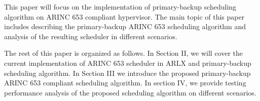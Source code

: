 \documentclass[conference]{IEEEtran}
\begin{document}
This paper will focus on the implementation of primary-backup scheduling algorithm on ARINC 653
compliant hypervisor. The main topic of this paper includes describing the primary-backup ARINC
653 scheduling algorithm and analysis of the resulting scheduler in different scenarios.

The rest of this paper is organized as follows. In Section II, we will cover the current
implementation of ARINC 653 scheduler in ARLX and primary-backup scheduling algorithm. In
Section III we introduce the proposed primary-backup ARINC 653 compliant scheduling algorithm.
In section IV, we provide testing performance analysis of the proposed scheduling algorithm on
different scenarios.





%
%

\end{document}
